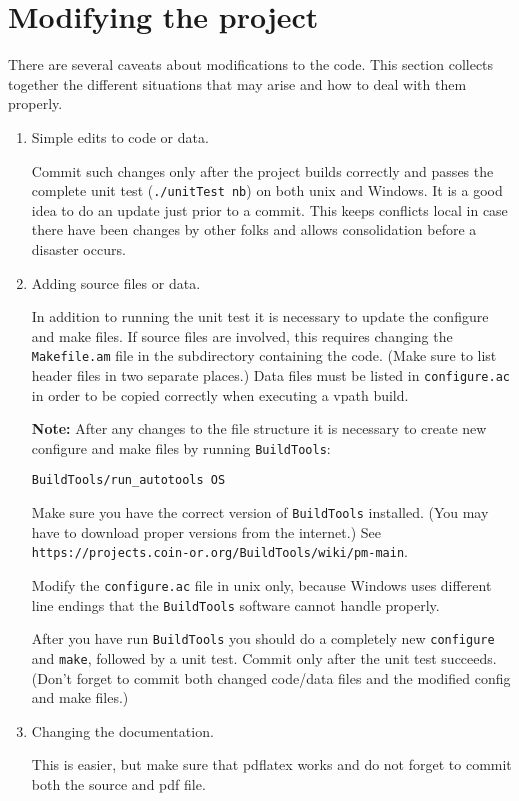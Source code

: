 \section{Modifying the project}\label{section:ModifyingProject} 

There are several caveats about modifications to the code. This section collects together the different situations that may arise and how to deal with them properly.

\begin{enumerate}

\item Simple edits to code or data.

Commit such changes only after the project builds correctly and passes the complete unit test 
({\tt ./unitTest nb}) on both unix and Windows. It is a good idea to do an update just prior to a commit. This keeps conflicts local in case there have been changes by other folks and allows consolidation before a disaster occurs. 

\item Adding source files or data.

In addition to running the unit test it is necessary to update the configure and make files. 
If source files are involved, this requires changing the {\tt Makefile.am} file in the subdirectory 
containing the code. (Make sure to list header files in two separate places.) Data files must be listed in 
{\tt configure.ac} in order to be copied correctly when executing a vpath build. 


{\bf Note:} After any changes to the file structure it is necessary to create new configure and make files by running {\tt BuildTools}:
\begin{verbatim}
BuildTools/run_autotools OS
\end{verbatim}

Make sure you have the correct version of {\tt BuildTools} installed. (You may have to download proper versions from the internet.) See {\tt https://projects.coin-or.org/BuildTools/wiki/pm-main}.

Modify the {\tt configure.ac} file in unix only, because Windows uses different line endings that the 
{\tt BuildTools} software cannot handle properly. 


\medskip

After you have run {\tt BuildTools} you should do a completely new {\tt configure} and {\tt make}, followed by a unit test. Commit only after the unit test succeeds. (Don't forget to commit both changed code/data files and the modified config and make files.)

\item Changing the documentation.

This is easier, but make sure that pdflatex works and do not forget to commit both the source and pdf file. 

\end{enumerate}

